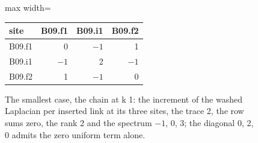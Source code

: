\begin{figure}[h]
\centering
\begin{adjustbox}{max width=\linewidth}\begin{tabular}{lrrr}
\hline
site & B09.f1 & B09.i1 & B09.f2 \\
\hline
B09.f1 & 0 & $-1$ & 1 \\
B09.i1 & $-1$ & 2 & $-1$ \\
B09.f2 & 1 & $-1$ & 0 \\
\hline
\end{tabular}\end{adjustbox}
\caption{The smallest case, the chain at k 1: the increment of the washed Laplacian per inserted link at its three sites, the trace 2, the row sums zero, the rank 2 and the spectrum $-1$, 0, 3; the diagonal 0, 2, 0 admits the zero uniform term alone.}
\end{figure}
